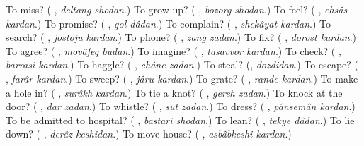 \begin{tcolorbox}[breakable,colback=teal!4,colframe=teal!35!black,title={Before you move on}]
To miss? (\textbf{ }, \emph{deltang shodan}.) To grow up? (\textbf{ }, \emph{bozorg shodan}.) To feel? (\textbf{ }, \emph{ehsâs kardan}.) To promise? (\textbf{ }, \emph{qol dâdan}.) To complain? (\textbf{ }, \emph{shekâyat kardan}.) To search? (\textbf{ }, \emph{jostoju kardan}.) To phone? (\textbf{ }, \emph{zang zadan}.) To fix? (\textbf{ }, \emph{dorost kardan}.) To agree? (\textbf{ }, \emph{movâfeq budan}.) To imagine? (\textbf{ }, \emph{tasavvor kardan}.) To check? (\textbf{ }, \emph{barrasi kardan}.) To haggle? (\textbf{ }, \emph{châne zadan}.) To steal? (\textbf{}, \emph{dozdidan}.) To escape? (\textbf{ }, \emph{farâr kardan}.) To sweep? (\textbf{ }, \emph{jâru kardan}.) To grate? (\textbf{ }, \emph{rande kardan}.) To make a hole in? (\textbf{ }, \emph{surâkh kardan}.) To tie a knot? (\textbf{ }, \emph{gereh zadan}.) To knock at the door? (\textbf{ }, \emph{dar zadan}.) To whistle? (\textbf{ }, \emph{sut zadan}.) To dress? (\textbf{ }, \emph{pânsemân kardan}.) To be admitted to hospital? (\textbf{ }, \emph{bastari shodan}.) To lean? (\textbf{ }, \emph{tekye dâdan}.) To lie down? (\textbf{ }, \emph{derâz keshidan}.) To move house? (\textbf{  }, \emph{asbâbkeshi kardan}.)
\end{tcolorbox}
